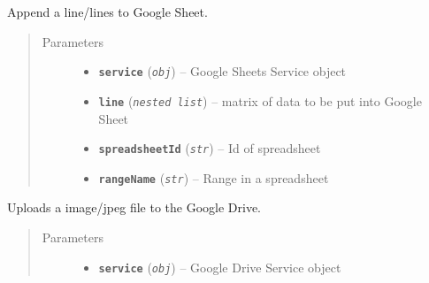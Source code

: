 \documentclass[letterpaper,10pt,english,openany]{sphinxmanual}
\begin{document}
\begin{fulllineitems}
\begin{fulllineitems}
\begin{description}
\end{description}

\end{fulllineitems}


\begin{fulllineitems}
\label{rpicameramon:rpicameramon.telemetry.GoogleHandler.add_sheet_line}
Append a line/lines to Google Sheet.
\begin{quote}\begin{description}
\item[{Parameters}] \leavevmode\begin{itemize}
\item {} 
\textbf{\texttt{service}} (\emph{\texttt{obj}}) -- Google Sheets Service object

\item {} 
\textbf{\texttt{line}} (\emph{\texttt{nested list}}) -- matrix of data to be put into Google Sheet

\item {} 
\textbf{\texttt{spreadsheetId}} (\emph{\texttt{str}}) -- Id of spreadsheet

\item {} 
\textbf{\texttt{rangeName}} (\emph{\texttt{str}}) -- Range in a spreadsheet

\end{itemize}

\end{description}\end{quote}

\end{fulllineitems}


\begin{fulllineitems}
\label{rpicameramon:rpicameramon.telemetry.GoogleHandler.upload_file}
Uploads a image/jpeg file to the Google Drive.
\begin{quote}\begin{description}
\item[{Parameters}] \leavevmode\begin{itemize}
\item {} 
\textbf{\texttt{service}} (\emph{\texttt{obj}}) -- Google Drive Service object


\end{itemize}
\end{description}
\end{quote}
\end{fulllineitems}
\end{fulllineitems}
\end{document}
